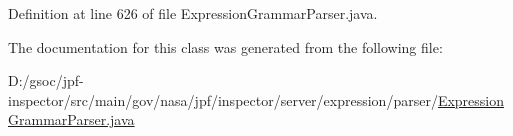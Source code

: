 Definition at line 626 of file Expression\+Grammar\+Parser.\+java.



The documentation for this class was generated from the following file\+:\begin{DoxyCompactItemize}
\item 
D\+:/gsoc/jpf-\/inspector/src/main/gov/nasa/jpf/inspector/server/expression/parser/\hyperlink{_expression_grammar_parser_8java}{Expression\+Grammar\+Parser.\+java}\end{DoxyCompactItemize}

